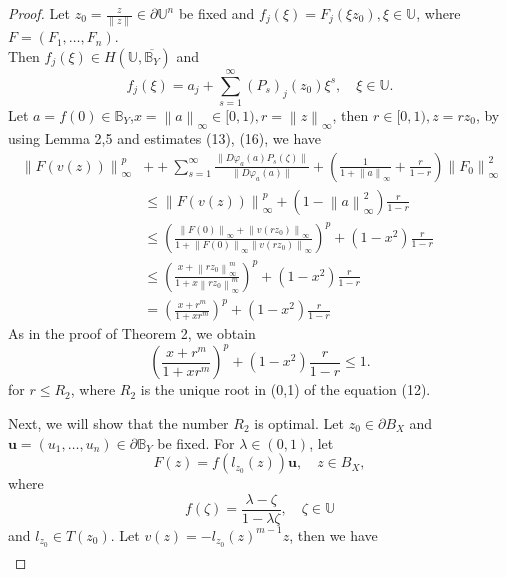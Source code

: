 \documentclass{birkjour}
\theoremstyle{plain}
\theoremstyle{definition}
\theoremstyle{definition}
\begin{document}
    \begin{proof}
	Let $z_0=\frac{z}{\left \| z \right \| } \in \partial \mathbb{U} ^n$ be fixed and $f_j(\xi )=F_j(\xi z_0), \xi \in \mathbb{U} $, where $F=(F_1,\dots ,F_n)$.\\
    Then $f_j(\xi )\in H(\mathbb{U},\overline{\mathbb{B}_Y} )$ and
    \begin{equation*}
	f_j(\xi )=a_j+\sum_{s=1}^{\infty} (P_s)_j(z_0)\xi ^s, \quad \xi \in \mathbb{U}.
    \end{equation*}
    Let $a=f(0)\in \mathbb{B}_Y$,$x=\left \| a \right \|_{\infty}\in [0,1), r=\left \| z \right \|_{\infty}$, then $ r \in [0,1), z=rz_0$,  by using Lemma 2,5 and estimates (13), (16), we have
	\begin{align*}
		\left \| F(v(z)) \right \|_{\infty}^p &++\sum_{s=1}^{\infty}	\frac{\|D\varphi_a(a)P_s(\zeta)\|}{\|D\varphi_a(a)\|}+(\frac{1}{1+\left \| a \right \|_{\infty}} +\frac{r}{1-r}  )\left \| F_0 \right \|^2_{\infty}  \\
		&\le \left \| F(v(z)) \right \|_{\infty}^p+(1-\left \| a \right \|_{\infty}^2)\frac{r}{1-r}\\
		&\le (\frac{\left \| F(0) \right \|_\infty+\left \| v(rz_0) \right \|_\infty }{1+\left \| F(0) \right \|_\infty\left \| v(rz_0) \right \|_\infty})^p+(1-x^2)\frac{r}{1-r}\\
		&\le (\frac{x+\left \| rz_0 \right \|_\infty^m }{1+x\left \| rz_0 \right \|_\infty^m})^p+(1-x^2)\frac{r}{1-r}\\
		&=(\frac{x+r^m }{1+xr^m})^p+(1-x^2)\frac{r}{1-r}
	\end{align*}
    As in the proof of Theorem 2, we obtain
	\begin{equation*}
		(\frac{x+r^m }{1+xr^m})^p+(1-x^2)\frac{r}{1-r}\le 1.
	\end{equation*}
    for $r \le R_2$, where $R_2$ is the unique root in (0,1) of the equation (12).
	\par
	Next, we will show that the number $R_2$ is optimal.
	Let $z_0\in \partial B_X$ and $\mathbf{u}=(u_1,\dots,u_n)\in \partial \mathbb{B}_Y$ be fixed. For $\lambda\in(0,1)$, let
	\begin{equation*}
		F(z)=f(l_{z_0}(z))\mathbf{u},\quad z\in B_X,
	\end{equation*}
	where
	\begin{equation*}
		f(\zeta)=\frac{\lambda-\zeta}{1-\lambda\zeta},\quad \zeta\in \mathbb{U}
	\end{equation*}
	and $l_{z_0}\in T(z_0)$.
	Let $v(z)=-l_{z_0}(z)^{m-1}z$, then we have
	\begin{align*}

\end{align*}
\end{proof}
\end{document}
